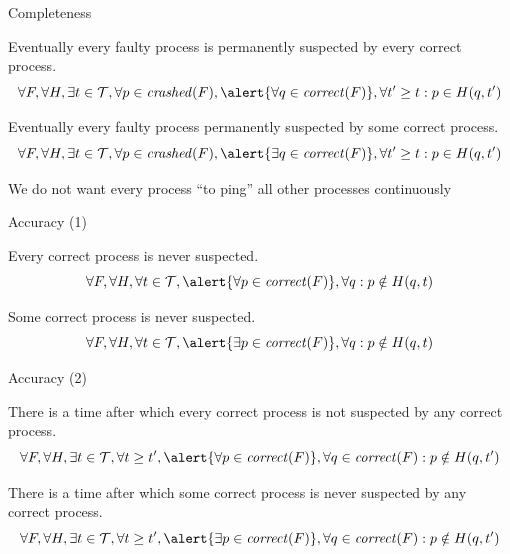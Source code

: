 \begin{frame}{Completeness}
	
\begin{definition}
Eventually every faulty process is permanently suspected by \alert{every} correct process.	
\[
\forall F, \forall H, \exists t \in {\cal T}, \forall p \in \Crashed(F), \alert{\forall q \in \Correct(F)}, \forall t' \geq t : p \in H(q,t')
\]
\end{definition}
	
\begin{definition}
Eventually every faulty process permanently suspected by \alert{some} correct process.	
\[
\forall F, \forall H, \exists t \in {\cal T}, \forall p \in \Crashed(F), \alert{\exists q \in \Correct(F)}, \forall t' \geq t : p \in H(q,t')
\]
\end{definition}
	
\bigskip
{}

We do not want every process “to ping” all other processes continuously

\end{frame}
 	
\begin{frame}{Accuracy (1)}

\begin{definition}
\alert{Every} correct process is never suspected.
\[
\forall F, \forall H, \forall t \in {\cal T}, \alert{\forall p \in \Correct(F)}, \forall q : p \notin H(q, t)
\]
\end{definition}

\begin{definition}
\alert{Some} correct process is never suspected.
\[
\forall F, \forall H, \forall t \in {\cal T},\alert{ \exists p \in \Correct(F)}, \forall q : p \notin H(q, t)
\]
\end{definition}
	
	
\end{frame}

\begin{frame}{Accuracy (2)}

\begin{definition}
There is a time after which \alert{every} correct process is not suspected by any correct process.
\[
\forall F, \forall H, \exists t \in {\cal T}, \forall t \geq t', \alert{\forall p \in \Correct(F)}, \forall q \in \Correct(F): p \notin  H(q,t')
\]
\end{definition}

\begin{definition}
There is a time after which \alert{some} correct process is never suspected by any correct process.
\[
\forall F, \forall H, \exists t \in {\cal T}, \forall t \geq t', \alert{\exists p \in \Correct(F)}, \forall q \in \Correct(F): p \notin  H(q,t')
\]
\end{definition}
	
	
\end{frame}

